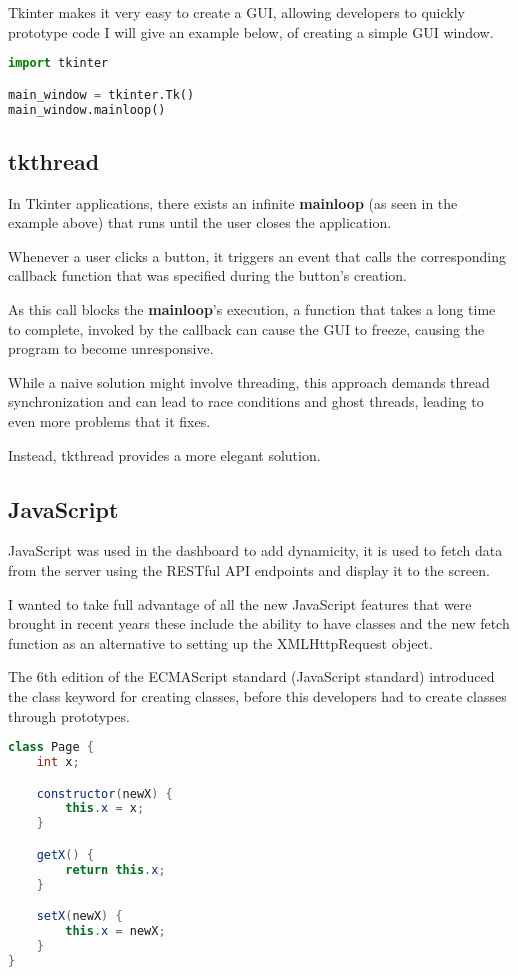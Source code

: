 Tkinter makes it very easy to create a GUI, allowing developers to quickly prototype code
I will give an example below,
of creating a simple GUI window.

\begin{lstlisting}[language=Python]
import tkinter

main_window = tkinter.Tk()
main_window.mainloop()
\end{lstlisting}

\subsection{tkthread}
In Tkinter applications, there exists an infinite \textbf{mainloop}
(as seen in the example above)
that runs until the user closes the application.

Whenever a user clicks a button,
it triggers an event that calls the corresponding callback function
that was specified during the button's creation.

As this call blocks the \textbf{mainloop}'s execution,
a function that takes a long time to complete,
invoked by the callback can cause the GUI to freeze,
causing the program to become unresponsive.

While a naive solution might involve threading,
this approach demands thread synchronization and can lead to race conditions
and ghost threads, leading to even more problems that it fixes.

Instead, tkthread provides a more elegant solution.

\subsection{JavaScript}
JavaScript was used in the dashboard to add dynamicity,
it is used to fetch data from the server using the RESTful API endpoints
and display it to the screen.

I wanted to take full advantage of all the new JavaScript features that were brought in
recent years these include the ability to have classes and the new fetch function as an alternative to setting up the XMLHttpRequest object.

The 6th edition of the ECMAScript standard \cite{ES6} (JavaScript standard) 
introduced the class keyword for creating classes,
before this developers had to create classes through prototypes.
\begin{lstlisting}[language=Java]
class Page {
    int x;

    constructor(newX) {
        this.x = x;
    }

    getX() {
        return this.x;
    }

    setX(newX) {
        this.x = newX;
    }
}
\end{lstlisting}


